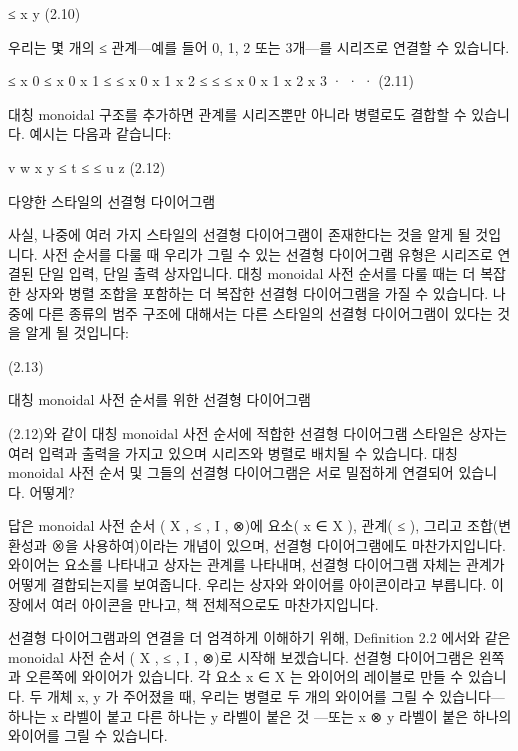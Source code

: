 \documentclass[11pt, a4paper, twoside, openany]{book}
\begin{document}
\par\medskip
≤
x
y
(2.10)

\par\medskip
우리는 몇 개의 ≤ 관계—예를 들어 0, 1, 2 또는 3\hspace{0pt}개—를 시리즈로 연결할 수 있습니다.

\par\medskip
≤
x 0
≤
x 0
x 1
≤
≤
x 0
x 1
x 2
≤
≤
≤
x 0
x 1
x 2
x 3
· · ·
(2.11)

\par\medskip
대칭 monoidal 구조를 추가하면 관계를 시리즈뿐만 아니라 병렬로도 결합할 수 있습니다. 예시는 다음과 같습니다:

\par\medskip
v
w
x
y
≤
t
≤
≤
u
z
(2.12)

\par\medskip
다양한 스타일의 선결형 다이어그램

\par\medskip
사실, 나중에 여러 가지 스타일의 선결형 다이어그램이 존재한다는 것을 알게 될 것입니다. 사전 순서를 다룰 때 우리가 그릴 수 있는 선결형 다이어그램 유형은 시리즈로 연결된 단일 입력, 단일 출력 상자입니다. 대칭 monoidal 사전 순서를 다룰 때는 더 복잡한 상자와 병렬 조합을 포함하는 더 복잡한 선결형 다이어그램을 가질 수 있습니다. 나중에 다른 종류의 범주 구조에 대해서는 다른 스타일의 선결형 다이어그램이 있다는 것을 알게 될 것입니다:

\par\medskip
(2.13)

\par\medskip
대칭 monoidal 사전 순서를 위한 선결형 다이어그램

\par\medskip
(2.12)와 같이 대칭 monoidal 사전 순서에 적합한 선결형 다이어그램 스타일은 상자는 여러 입력과 출력을 가지고 있으며 시리즈와 병렬로 배치될 수 있습니다. 대칭 monoidal 사전 순서 및 그들의 선결형 다이어그램은 서로 밀접하게 연결되어 있습니다. 어떻게?

\par\medskip
답은 monoidal 사전 순서 ( X , ≤ , I , ⊗)에 요소( x ∈ X ), 관계( ≤ ), 그리고 조합(변환성과 ⊗을 사용하여)이라는 개념이 있으며, 선결형 다이어그램에도 마찬가지입니다. 와이어는 요소를 나타내고 상자는 관계를 나타내며, 선결형 다이어그램 자체는 관계가 어떻게 결합되는지를 보여줍니다. 우리는 상자와 와이어를 아이콘이라고 부릅니다. 이 장에서 여러 아이콘을 만나고, 책 전체적으로도 마찬가지입니다.

\par\medskip
선결형 다이어그램과의 연결을 더 엄격하게 이해하기 위해, Deﬁnition 2.2 에서와 같은 monoidal 사전 순서 ( X , ≤ , I , ⊗)로 시작해 보겠습니다. 선결형 다이어그램은 왼쪽과 오른쪽에 와이어가 있습니다. 각 요소 x ∈ X 는 와이어의 레이블로 만들 수 있습니다. 두 개체 x, y 가 주어졌을 때, 우리는 병렬로 두 개의 와이어를 그릴 수 있습니다— 하나는 x 라벨이 붙고 다른 하나는 y 라벨이 붙은 것 —또는 x ⊗ y 라벨이 붙은 하나의 와이어를 그릴 수 있습니다.
\end{document}

